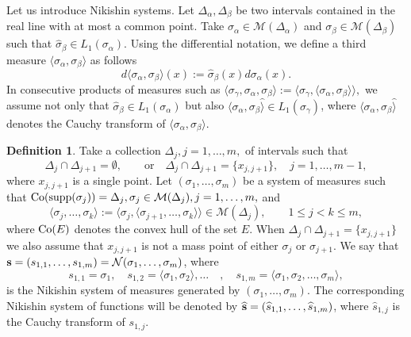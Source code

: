 \documentclass[10pt,a4paper]{article}
\theoremstyle{definition}
\newtheorem{definition}[theorem]{Definition}
\theoremstyle{remark}
\numberwithin{equation}{section}
\begin{document}
Let us introduce Nikishin systems. Let $\Delta_{\alpha}, \Delta_{\beta}$ be two intervals contained in the real line with at most a common point. Take $\sigma_{\alpha} \in {\mathcal{M}}(\Delta_{\alpha})$ and $\sigma_{\beta} \in {\mathcal{M}}(\Delta_{\beta})$ such that $\widehat{\sigma}_{\beta} \in L_1(\sigma_{\alpha})$. Using the  differential notation, we define a third measure $\langle \sigma_{\alpha},\sigma_{\beta} \rangle$ as follows
\[d \langle \sigma_{\alpha},\sigma_{\beta} \rangle (x) := \widehat{\sigma}_{\beta}(x) d\sigma_{\alpha}(x).\]
In consecutive products of measures such as $\langle \sigma_{\gamma},  \sigma_{\alpha},\sigma_{\beta} \rangle :=\langle \sigma_{\gamma}, \langle \sigma_{\alpha},\sigma_{\beta} \rangle \rangle,$ we assume not only that $\widehat{\sigma}_{\beta} \in L_1(\sigma_{\alpha})$ but also $\langle \sigma_{\alpha},\sigma_{\beta} \widehat{\rangle} \in L_1(\sigma_{\gamma})$, where $\langle \sigma_{\alpha},\sigma_{\beta} \widehat{\rangle}$ denotes the Cauchy transform of $\langle \sigma_{\alpha},\sigma_{\beta}  {\rangle}$.

\begin{definition}
Take a collection  $\Delta_j, j=1,\ldots,m,$ of intervals such that
\[ \Delta_j \cap \Delta_{j+1} = \emptyset, \qquad \mbox{or} \quad \Delta_j \cap \Delta_{j+1} = \{x_{j,j+1}\}, \quad j=1,\ldots,m-1,
\]
where $x_{j,j+1}$ is a single point. Let $(\sigma_1,\ldots,\sigma_m)$ be a system of measures such that $\mbox{\rm Co}(\mbox{\rm supp} (\sigma_j)) = \Delta_j, \sigma_j \in {\mathcal{M}}(\Delta_j), j=1,\ldots,m,$  and
\begin{equation}\label{eq:autom}
\langle \sigma_{j},\ldots,\sigma_k  {\rangle} := \langle \sigma_j,\langle \sigma_{j+1},\ldots,\sigma_k\rangle\rangle\in {\mathcal{M}}(\Delta_j),  \qquad  1 \leq j < k\leq m,
\end{equation}
where $\mbox{\rm Co}(E)$ denotes the convex hull of the set $E$.
When $\Delta_j \cap \Delta_{j+1} = \{x_{j,j+1}\}$ we also assume that $x_{j,j+1}$ is not a mass point of either $\sigma_j$ or $\sigma_{j+1}$.
We say that ${\bf s}=(s_{1,1},\ldots,s_{1,m}) = {\mathcal{N}}(\sigma_1,\ldots,\sigma_m)$, where
\[ s_{1,1} = \sigma_1, \quad s_{1,2} = \langle \sigma_1,\sigma_2 \rangle, \ldots \quad , \quad s_{1,m} = \langle \sigma_1, \sigma_2,\ldots,\sigma_m  \rangle,
\]
is the Nikishin system of measures generated by $(\sigma_1,\ldots,\sigma_m)$. The corresponding Nikishin system of functions will be denoted  by ${\bf \widehat{s}}=\left(\widehat{s}_{1,1},\ldots,\widehat{s}_{1,m}\right)$, where $\widehat{s}_{1,j}$ is the Cauchy transform of $s_{1,j}$.
\end{definition}
\end{document}
